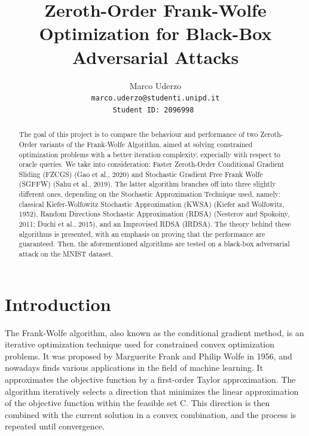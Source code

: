 \documentclass[10pt,twocolumn,letterpaper]{article}
\begin{document}
\title{Zeroth-Order Frank-Wolfe Optimization for Black-Box Adversarial Attacks}

\author{Marco Uderzo  \\
{\tt\small marco.uderzo@studenti.unipd.it}\\ 
\tt \small Student ID: 2096998
}

\maketitle

\begin{abstract}
   The goal of this project is to compare the behaviour and performance
   of two Zeroth-Order variants of the Frank-Wolfe Algorithm, aimed at 
   solving constrained optimization problems with a better iteration complexity,
   expecially with respect to oracle queries.
   We take into consideration: Faster Zeroth-Order Conditional Gradient Sliding (FZCGS)
   (Gao et al., 2020)\cite{Gao} and Stochastic Gradient Free Frank Wolfe 
   (SGFFW) (Sahu et al., 2019)\cite{Sahu}. The latter algorithm branches off into three slightly different ones,
   depending on the Stochastic Approximation Technique used, namely: classical Kiefer-Wolfowitz
   Stochastic Approximation (KWSA) (Kiefer and Wolfowitz, 1952), Random Directions Stochastic Approximation
   (RDSA) (Nesterov and Spokoiny, 2011; Duchi et al., 2015), and an Improvised RDSA (IRDSA). 
   The theory behind these algorithms is presented, with an emphasis on proving that the performance are guaranteed. 
   Then, the aforementioned algorithms are tested on a black-box adversarial attack on the MNIST dataset. 

\end{abstract}

\section{Introduction}

The Frank-Wolfe algorithm, also known as the conditional gradient method, 
is an iterative optimization technique used for constrained convex optimization problems. 
It was proposed by Marguerite Frank and Philip Wolfe in 1956, and nowadays finds various applications
in the field of machine learning. It approximates the objective function by a first-order Taylor approximation.
The algorithm iteratively selects a direction that minimizes the linear approximation of the objective function
within the feasible set C. This direction is then combined with the current solution in a convex combination, and the
process is repeated until convergence.
\end{document}
